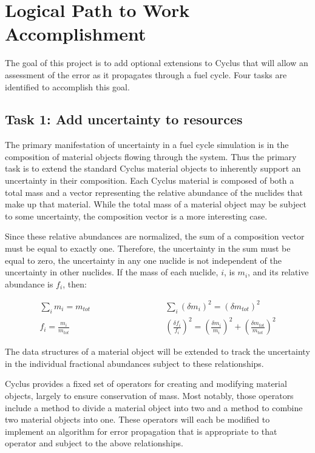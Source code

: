 \documentclass[dvips,12pt]{article}
\newcommand{\unc}[1]
{ \delta #1 }
\newcommand{\uncsq}[1]
{ \left(\unc{#1}\right)^2 }
\newcommand{\uncratio}[1]
{ \left(\frac{\unc{#1}}{#1}\right) }
\newcommand{\uncratiosq}[1]
{ \uncratio{#1}^2 }
\begin{document}
\section{Logical Path to Work Accomplishment}
The goal of this project is to add optional
extensions to Cyclus that will allow an assessment
of the error as it propagates through a fuel
cycle.  Four tasks are identified to accomplish
this goal.


\subsection{Task 1: Add uncertainty to resources}

The primary manifestation of uncertainty in a fuel
cycle simulation is in the composition of material
objects flowing through the system.  Thus the
primary task is to extend the standard Cyclus
material objects to inherently support an
uncertainty in their composition.  Each Cyclus
material is composed of both a total mass and a
vector representing the relative abundance of the
nuclides that make up that material.  While the
total mass of a material object may be subject to
some uncertainty, the composition vector is a more
interesting case.

Since these relative abundances are normalized,
the sum of a composition vector must be equal to
exactly one. Therefore, the uncertainty in the sum
must be equal to zero, the uncertainty in any one
nuclide is not independent of the uncertainty in
other nuclides.  If the mass of each nuclide, $i$,
is $m_i$, and its relative abundance is $f_i$,
then:

\begin{align*}
  \sum_i m_i = m_{tot} \qquad\qquad&\qquad\qquad  
       \sum_i \uncsq{m_i} = \uncsq{m_{tot}}\\
  f_i = \frac{m_i}{m_{tot}} \qquad\qquad&\qquad\qquad  
       \uncratiosq{f_i} = \uncratiosq{m_i} + \uncratiosq{m_{tot}}
\end{align*}

The data structures of a material object will be
extended to track the uncertainty in the
individual fractional abundances subject to these
relationships.

Cyclus provides a fixed set of operators for
creating and modifying material objects, largely
to ensure conservation of mass.  Most notably,
those operators include a method to divide a
material object into two and a method to combine
two material objects into one.  These operators
will each be modified to implement an algorithm
for error propagation that is appropriate to that
operator and subject to the above relationships.
\end{document}
